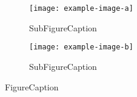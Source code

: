 \begin{figure}[!h]
    \centering
    \begin{subfigure}[b]{0.49\textwidth}
        \centering
        \texttt{[image: example-image-a]}
        \caption{SubFigureCaption}
    \end{subfigure}
    \hfill
    \begin{subfigure}[b]{0.49\textwidth}
        \centering
        \texttt{[image: example-image-b]}
        \caption{SubFigureCaption}
    \end{subfigure}
    \caption{FigureCaption}
\end{figure}